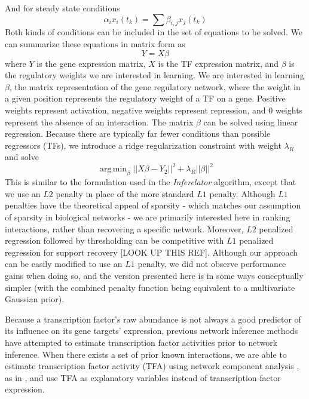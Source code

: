 \documentclass[11pt]{article}
\DeclareMathOperator*{\argmin}{arg\,min}
\begin{document}
And for steady state conditions
\begin{equation}
\alpha_{i}x_{i}(t_k) = \sum \beta_{i,j}x_{j}(t_k)
\end{equation}
Both kinds of conditions can be included in the set of equations to be solved. We can summarize these equations in matrix form as
\begin{equation}
Y = X \beta 
\end{equation}
where $Y$ is the gene expression matrix, $X$ is the TF expression matrix, and $\beta$ is the regulatory weights we are interested in learning.
We are interested in learning $\beta$, the matrix representation of the gene regulatory network, where the weight in a given position represents the regulatory weight of a TF on a gene. 
Positive weights represent activation, negative weights represent repression, and 0 weights represent the absence of an interaction. The matrix $\beta$ can be solved using linear regression. 
Because there are typically far fewer conditions than possible regressors (TFs), we introduce a ridge regularization constraint with weight $\lambda_R$ and solve
\begin{equation}
\argmin_\beta\vert \vert X\beta - Y_2 \vert \vert ^2 + \lambda_R \vert \vert \beta \vert \vert ^2
\end{equation}
This is similar to the formulation used in the \textit{Inferelator} algorithm, except that we use an $L2$ penalty in place of the more standard $L1$ penalty. Although $L1$ penalties have the theoretical appeal of sparsity - which matches our assumption of sparsity in biological networks - we are primarily interested here in ranking interactions, rather than recovering a specific network. Moreover, $L2$ penalized regression followed by thresholding can be competitive with $L1$ penalized regression for support recovery \cite{} [LOOK UP THIS REF]. Although our approach can be easily modified to use an $L1$ penalty, we did not observe performance gains when doing so, and the version presented here is in some ways conceptually simpler (with the combined penalty function being equivalent to a multivariate Gaussian prior). 

Because a transcription factor's raw abundance is not always a good predictor of its influence on its gene targets' expression, previous network inference methods have attempted to estimate transcription factor activities prior to network inference. When there exists a set of prior known interactions, we are able to estimate transcription factor activity (TFA) using network component analysis \cite{liao2003network}, as in \cite{arrieta-ortiz_experimentally_2015, fu_reconstructing_2011}, and use TFA as explanatory variables instead of transcription factor expression. 
\end{document}
